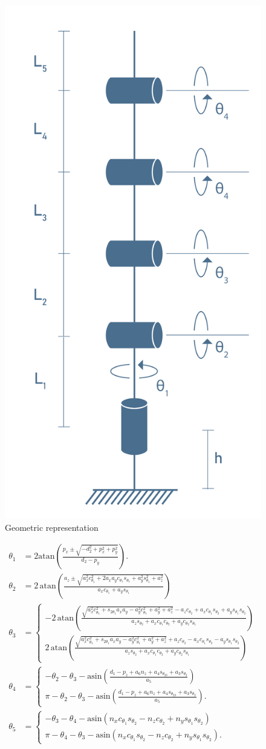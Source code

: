 \documentclass[11pt,a4paper, titlepage]{article}
\begin{document}
	\begin{figure}[H]
		\centering
		\includegraphics[width=0.3\linewidth]{../Diagrams/Model.png}
		\caption{Geometric representation}
		\label{fig:geometric}
	\end{figure}
	
	\begin{align*}
\theta_1 &= 2\mathrm{atan}\left(\frac{p_x \pm \sqrt{-d_2^2 + p_x^2 +p_y^2}}{d_2 - p_y}\right). \\[10pt]
\theta_2 &= 2\,\mathrm{atan}\left(\frac{a_z \pm \sqrt{a_x^2c_{\theta_1}^2+2a_xa_yc_{\theta_1}s_{\theta_1}+a_y^2s_{\theta_1}^2+a_z^2}}{a_xc_{\theta_1} + a_ys_{\theta_1}}\right) \\[10pt]
\theta_3 &= 
\begin{cases}
-2\,\mathrm{atan}\left(\frac{\sqrt{a_x^2c_{\theta_1}^2 + s_{2\theta_1}a_xa_y-a_y^2c_{\theta_1}^2 + a_y^2 + a_z^2} - a_zc_{\theta_2}+a_xc_{\theta_1}s_{\theta_2}+a_ys_{\theta_1}s_{\theta_2}}{a_zs_{\theta_2} + a_xc_{\theta_1}c_{\theta_2} + a_yc_{\theta_2}s_{\theta_1}}\right) \\[10pt]
2\,\mathrm{atan}\left(\frac{\sqrt{a_x^2c_{\theta_1}^2 + s_{2\theta_1}a_xa_y-a_y^2c_{\theta_1}^2 + a_y^2 + a_z^2} + a_zc_{\theta_2} - a_xc_{\theta_1}s_{\theta_2} - a_ys_{\theta_1}s_{\theta_2}}{a_zs_{\theta_2} + a_xc_{\theta_1}c_{\theta_2} + a_yc_{\theta_2}s_{\theta_1}}\right)
\end{cases} \\[10pt]
\theta_4 &= \begin{cases}
-\theta_2 - \theta_3 - \mathrm{asin}\left(\frac{d_1 - p_z + a_6n_z + a_4s_{\theta_{23}} + a_3s_{\theta_2}}{a_5}\right) \\[5pt]
\pi -\theta_2 - \theta_3 - \mathrm{asin}\left(\frac{d_1 - p_z + a_6n_z + a_4s_{\theta_{23}} + a_3s_{\theta_2}}{a_5}\right).
\end{cases} \\[10pt]
\theta_5 &= 
\begin{cases}
-\theta_3 - \theta_4 - \mathrm{asin}(n_xc_{\theta_1}s_{\theta_2} - n_zc_{\theta_2} + n_ys_{\theta_1}s_{\theta_2}) \\[5pt]
\pi - \theta_4 - \theta_3 - \mathrm{asin}(n_xc_{\theta_1}s_{\theta_2} - n_zc_{\theta_2} + n_ys_{\theta_1}s_{\theta_2}).
\end{cases}
\end{align*}
\end{document}
